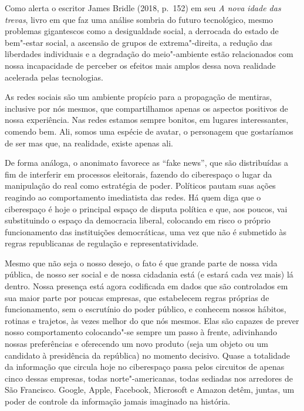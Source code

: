 Como alerta o escritor James Bridle (2018, p.~152) em seu \emph{A nova idade das trevas}, livro em que faz uma análise sombria do futuro tecnológico, mesmo problemas gigantescos como a desigualdade social, a derrocada do estado de bem"-estar social, a ascensão de grupos de extrema"-direita, a redução das liberdades individuais e a degradação do meio"-ambiente estão relacionados com nossa incapacidade de perceber os efeitos mais amplos dessa nova realidade acelerada pelas tecnologias.

As redes sociais são um ambiente propício para a propagação de mentiras, inclusive por nós mesmos, que compartilhamos apenas os aspectos positivos de nossa experiência. Nas redes estamos sempre bonitos, em lugares interessantes, comendo bem. Ali, somos uma espécie de avatar, o personagem que gostaríamos de ser mas que, na realidade, existe apenas ali.

De forma análoga, o anonimato favorece as ``fake news'', que são distribuídas a fim de interferir em processos eleitorais, fazendo do ciberespaço o lugar da manipulação do real como estratégia de poder. Políticos pautam suas ações reagindo ao comportamento imediatista das redes. Há quem diga que o ciberespaço é hoje o principal espaço de disputa política e que, aos poucos, vai substituindo o espaço da democracia liberal, colocando em risco o próprio funcionamento das instituições democráticas, uma vez que não é submetido às regras republicanas de regulação e representatividade.

Mesmo que não seja o nosso desejo,
o fato é que grande parte de nossa vida pública, de nosso ser social e
de nossa cidadania está (e estará cada vez mais) lá dentro. Nossa
presença está agora codificada em dados que são controlados em sua maior
parte por poucas empresas, que estabelecem regras próprias de
funcionamento, sem o escrutínio do poder público, e conhecem nossos
hábitos, rotinas e trajetos, às vezes melhor do que nós mesmos. Elas são
capazes de prever nosso comportamento colocando"-se sempre um passo à
frente, adivinhando nossas preferências e oferecendo um novo
produto (seja um objeto ou um candidato à presidência da república) no
momento decisivo. Quase a totalidade da informação que circula hoje no
ciberespaço passa pelos circuitos de apenas cinco dessas empresas, todas
norte"-americanas, todas sediadas nos arredores de São Francisco. Google,
Apple, Facebook, Microsoft e Amazon detêm, juntas, um poder de controle
da informação jamais imaginado na história.

